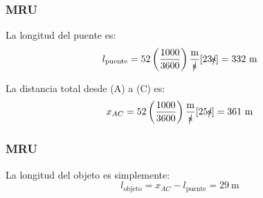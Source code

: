 \documentclass{beamer}
\begin{document}
\begin{frame}
\frametitle{MRU}
% 

La longitud del puente es:
{\large
\begin{equation} 
l_{\text{puente}}=
52\left(\frac{1000}{3600}\right)
\frac{\text{m}}{\cancel{\text{s}}} [23\cancel{\text{s}}]=
332~\text{m}
\end{equation}
}

                               

La distancia total desde (A) a (C) es: 
{\large
\begin{equation} 
x_{AC}=
52\left(\frac{1000}{3600}\right)
\frac{\text{m}}{\cancel{\text{s}}} [25\cancel{\text{s}}]=
361~\text{m}
\end{equation}
}

\end{frame}

\begin{frame}
\frametitle{MRU}
% 

La longitud del objeto es simplemente:
{\large
\begin{equation} 
l_{\text{objeto}}=
x_{AC}-l_{\text{puente}}
=
29~\text{m}
\end{equation}
}

                               

                                                             
\end{frame}

\end{document}

